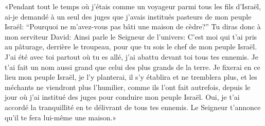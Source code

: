 «Pendant tout le temps où j’étais comme un voyageur parmi tous les fils d’Israël,
	ai-je demandé à un seul des juges que j’avais institués pasteurs de mon peuple Israël:
	“Pourquoi ne m’avez-vous pas bâti une maison de cèdre?”
Tu diras donc à mon serviteur David: Ainsi parle le Seigneur de l’univers:
	C’est moi qui t’ai pris au pâturage, derrière le troupeau,
	pour que tu sois le chef de mon peuple Israël.
J’ai été avec toi partout où tu es allé, j’ai abattu devant toi tous tes ennemis.
	Je t’ai fait un nom aussi grand que celui des plus grands de la terre.
Je fixerai en ce lieu mon peuple Israël,
	je l’y planterai, il s’y établira et ne tremblera plus,
	et les méchants ne viendront plus l’humilier, comme ils l’ont fait autrefois,
	depuis le jour où j’ai institué des juges pour conduire mon peuple Israël.
Oui, je t’ai accordé la tranquillité en te délivrant de tous tes ennemis.
	Le Seigneur t’annonce qu’il te fera lui-même une maison.»
